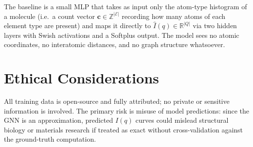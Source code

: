 \documentclass[final]{article}
\begin{document}
The baseline is a small MLP that takes as input only the atom-type histogram of a molecule
(i.e.\ a count vector $\mathbf{c} \in \mathbb{Z}^{|\mathcal{E}|}$ recording how many atoms of
each element type are present) and maps it directly to $\hat{I}(q) \in \mathbb{R}^{|Q|}$
via two hidden layers with Swish activations and a Softplus output. The model sees no atomic
coordinates, no interatomic distances, and no graph structure whatsoever.

\section{Ethical Considerations}

All training data is open-source and fully attributed; no private or sensitive information
is involved. The primary risk is misuse of model predictions: since the GNN is an
approximation, predicted $I(q)$ curves could mislead structural biology or materials
research if treated as exact without cross-validation against the ground-truth computation.

\newpage


\end{document}
